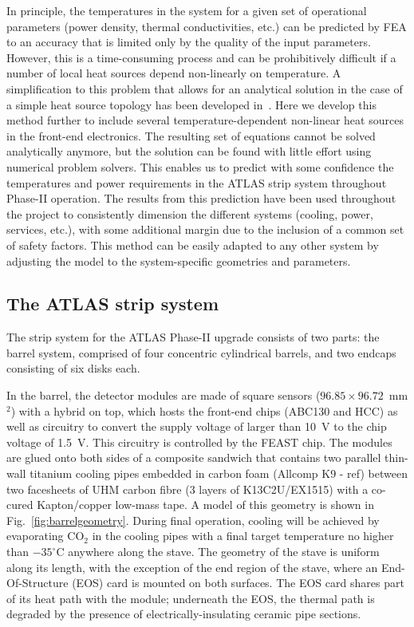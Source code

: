 In principle, the temperatures in the system for a given set of operational parameters (power density, thermal conductivities, etc.) can be predicted by FEA to an accuracy that is limited only by the quality of the input parameters. However, this is a time-consuming process and can be prohibitively difficult if a number of local heat sources depend non-linearly on temperature. A simplification to this problem that allows for an analytical solution in the case of a simple heat source topology has been developed in~\cite{Beck:2010zzd}. Here we develop this method further to include several temperature-dependent non-linear heat sources in the front-end electronics. The resulting set of equations cannot be solved analytically anymore, but the solution can be found with little effort using numerical problem solvers. This enables us to predict with some confidence the temperatures and power requirements in the ATLAS strip system throughout Phase-II operation. The results from this prediction have been used throughout the project to consistently dimension the different systems (cooling, power, services, etc.), with some additional margin due to the inclusion of a common set of safety factors. This method can be easily adapted to any other system by adjusting the model to the system-specific geometries and parameters.

\subsection{The ATLAS strip system}
The strip system for the ATLAS Phase-II upgrade \cite{Collaboration:2017mtb} consists of two parts: the barrel system, comprised of four concentric cylindrical barrels, and two endcaps consisting of six disks each.

In the barrel, the detector modules are made of square sensors ($96.85\times 96.72$~mm$^2$) with a hybrid on top, which hosts the front-end chips (ABC130 and HCC) as well as circuitry to convert the supply voltage of larger than 10~V to the chip voltage of 1.5~V. This circuitry is controlled by the FEAST chip. The modules are glued onto both sides of a composite sandwich that contains two parallel thin-wall titanium cooling pipes embedded in carbon foam (Allcomp K9 - ref)  between two facesheets of UHM carbon fibre (3 layers of K13C2U/EX1515) with a co-cured Kapton/copper low-mass tape. A model of this geometry is shown in Fig.~\ref{fig:barrelgeometry}. During final operation, cooling will be achieved by evaporating CO$_2$ in the cooling pipes with a final target temperature no higher than $-35^\circ$C anywhere along the stave. The geometry of the stave is uniform along its length, with the exception of the end region of the stave, where an End-Of-Structure (EOS) card is mounted on both surfaces. The EOS card shares part of its heat path with the module; underneath the EOS, the thermal path is degraded by the presence of electrically-insulating ceramic pipe sections. 


